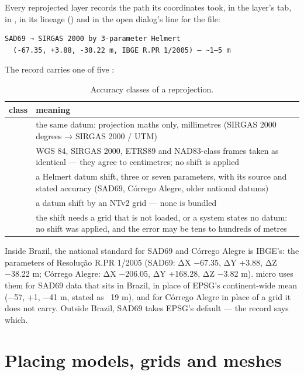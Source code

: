 Every reprojected layer records the path its coordinates took, in the layer's  tab, in
, in its lineage () and in the open dialog's line for the file:

\begin{lstlisting}
SAD69 → SIRGAS 2000 by 3-parameter Helmert
  (-67.35, +3.88, -38.22 m, IBGE R.PR 1/2005) — ~1–5 m
\end{lstlisting}

The record carries one of five :

\begin{table}[htbp]\small
\begin{tabularx}{\linewidth}{@{}lL@{}}\toprule
class & meaning \\ \midrule
{} & the same datum: projection maths only, millimetres (SIRGAS 2000 degrees → SIRGAS 2000 / UTM) \\
 & WGS 84, SIRGAS 2000, ETRS89 and NAD83-class frames taken as identical — they agree to centimetres; no shift is applied \\
 & a Helmert datum shift, three or seven parameters, with its source and stated accuracy (SAD69, Córrego Alegre, older national datums) \\
 & a datum shift by an NTv2 grid — none is bundled \\
 & the shift needs a grid that is not loaded, or a system states no datum: no shift was applied, and the error may be tens to hundreds of metres \\ \bottomrule
\end{tabularx}
\caption{Accuracy classes of a reprojection.}\label{tab:crs-accuracy}
\end{table}

\begin{why}
Inside Brazil, the national standard for SAD69 and Córrego Alegre is IBGE's: the parameters of
Resolução R.PR 1/2005 (SAD69: ΔX −67.35, ΔY +3.88, ΔZ −38.22 m; Córrego Alegre: ΔX −206.05,
ΔY +168.28, ΔZ −3.82 m). micro uses them for SAD69 data that sits in Brazil, in place of EPSG's
continent-wide mean (−57, +1, −41 m, stated as ~19 m), and for Córrego Alegre in place of a grid it
does not carry. Outside Brazil, SAD69 takes EPSG's default — the record says which.
\end{why}

\section{Placing models, grids and meshes}\label{sec:crs-placement}

